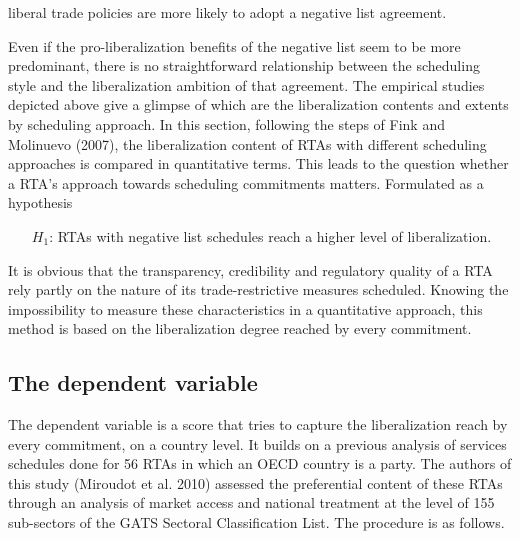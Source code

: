\documentclass{article}
\begin{document}
liberal trade policies are more likely to adopt a negative list agreement.

\smallskip

Even if the pro-liberalization benefits of the negative list seem to be more predominant, there is no straightforward relationship between the scheduling style and the liberalization ambition of that agreement. The empirical studies depicted above give a glimpse of which are the liberalization contents and extents by scheduling approach. In this section, following the steps of Fink and Molinuevo (2007), the liberalization content of RTAs with different scheduling approaches is compared in quantitative terms. This leads to the question whether a RTA’s approach towards scheduling commitments matters. Formulated as a hypothesis

\begin{itemize}
    \item[$H_1$:] RTAs with negative list schedules reach a higher level of liberalization.
\end{itemize}

It is obvious that the transparency, credibility and regulatory quality of a RTA rely partly on the nature of its trade-restrictive measures scheduled. Knowing the impossibility to measure these characteristics in a quantitative approach, this method is based on the liberalization degree reached by every commitment.

\subsection{The dependent variable}

The dependent variable is a score that tries to capture the liberalization reach by every commitment, on a country level. It builds on a previous analysis of services schedules done for 56 RTAs in which an OECD country is a party. The authors of this study (Miroudot et al. 2010) assessed the preferential content of these RTAs through an analysis of market access and national treatment at the level of 155 sub-sectors of the GATS Sectoral Classification List. The procedure is as follows.

\smallskip
\end{document}
